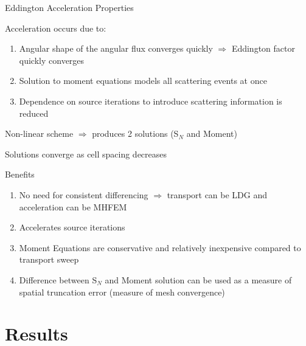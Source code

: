 \documentclass[10pt]{beamer}
\newcommand{\SN}{S$_N$\xspace}
\begin{document}
\begin{frame}{Eddington Acceleration Properties}

	\footnotesize
    
    \onslide<+->
    Acceleration occurs due to: 
    \begin{enumerate}
    	\item Angular shape of the angular flux converges quickly $\Rightarrow$ Eddington factor quickly converges 

    	\item Solution to moment equations models all scattering events at once 

    	\item Dependence on source iterations to introduce scattering information is reduced

    \end{enumerate}

    \onslide<+->
    Non-linear scheme $\Rightarrow$ produces 2 solutions (\SN and Moment)

    \onslide<+->
    Solutions converge as cell spacing decreases 

    \onslide<+->
    Benefits 
    \begin{enumerate}

    	\item No need for consistent differencing $\Rightarrow$ transport can be LDG and acceleration can be MHFEM 

    	\item Accelerates source iterations 

        \item Moment Equations are conservative and relatively inexpensive compared to transport sweep 

        \item Difference between \SN and Moment solution can be used as a measure of spatial truncation error (measure of mesh convergence)

    \end{enumerate}

\end{frame}

\section{Results}


\end{document}
